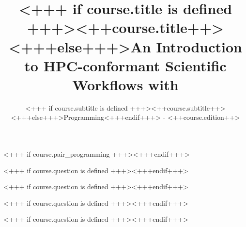 \documentclass[english,xcolor=pdftex,dvipsnames,aspectratio=<+++ if course.aspectratio is defined +++><++course.aspectratio++><+++else+++>43<+++endif+++>]{beamer}
\title[<++course.shorttitle++>]{<+++ if course.title is defined +++><++course.title++><+++else+++>An Introduction to HPC-conformant Scientific Workflows with \Snakemake<+++endif+++>}
\subtitle{<+++ if course.subtitle is defined +++><++course.subtitle++><+++else+++>Programming<+++endif+++> - <++course.edition++>}
\begin{document}

\begin{frame}[plain] %
  \titlepage
\end{frame}









<+++ if course.pair_programming +++><+++endif+++>






<+++ if course.question is defined +++><+++endif+++>


<+++ if course.question is defined +++><+++endif+++>
           

<+++ if course.question is defined +++><+++endif+++>
       

<+++ if course.question is defined +++><+++endif+++>
       
\end{document}
